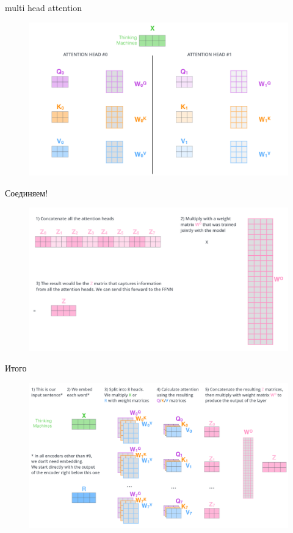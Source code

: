 \documentclass[notes,12pt, aspectratio=169]{beamer}
\begin{document}
\begin{frame}{multi head attention}
\begin{figure}
	\centering
	\includegraphics[width=0.8\linewidth]{images/multi_heads}
	\label{fig:seq2seq}
\end{figure}
\end{frame}

\begin{frame}{Соединяем!}
\begin{figure}
	\centering
	\includegraphics[width=0.8\linewidth]{images/transformer_attention_heads_weight_matrix_o}
	\label{fig:seq2seq}
\end{figure}
\end{frame}

\begin{frame}{Итого}
\begin{figure}
	\centering
	\includegraphics[width=0.8\linewidth]{images/final_attention}
	\label{fig:seq2seq}
\end{figure}
\end{frame}
\end{document}
